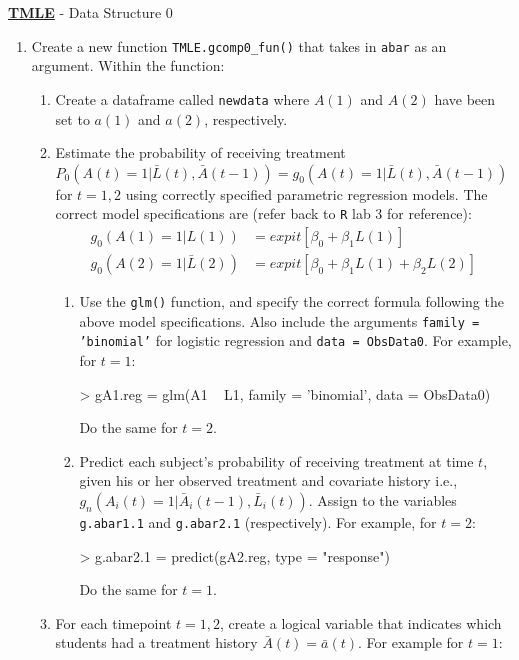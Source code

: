 \documentclass[answers]{exam}
\begin{document}
\noindent \textbf{\underline{TMLE}} - Data Structure 0
\begin{enumerate}
\item Create a new function \texttt{TMLE.gcomp0\_fun()} that takes in \texttt{abar} as an argument. Within the function:
\begin{enumerate}
\item Create a dataframe called \texttt{newdata} where $A(1)$ and $A(2)$ have been set to $a(1)$ and $a(2)$, respectively.
\item Estimate the probability of receiving treatment $P_0(A(t)=1|\bar{L}(t), \bar{A}(t-1)) = g_0(A(t)=1|\bar{L}(t), \bar{A}(t-1))$ for $t = 1,2$ using correctly specified parametric regression models. The correct model specifications are (refer back to \texttt{R} lab 3 for reference):
\begin{align*}
g_0(A(1)=1|L(1)) & = expit[\beta_0 + \beta_1L(1)] \\
g_0(A(2)=1|\bar{L}(2)) & = expit[\beta_0 + \beta_1L(1) + \beta_2L(2)]
\end{align*}
\begin{enumerate}
\item Use the \texttt{glm()} function, and specify the correct formula following the above model specifications. Also include the arguments \texttt{family = 'binomial'} for logistic regression and \texttt{data = ObsData0}. For example, for $t = 1$:
\begin{Schunk}
\begin{Sinput}
> gA1.reg = glm(A1 ~ L1, family = 'binomial', data = ObsData0)
\end{Sinput}
\end{Schunk}
Do the same for $t = 2$.
\item Predict each subject's probability of receiving treatment at time $t$, given his or her observed treatment and covariate history i.e., $g_n(A_i(t)=1|\bar{A}_i(t-1), \bar{L}_i(t))$. Assign to the variables \texttt{g.abar1.1} and \texttt{g.abar2.1} (respectively). For example, for $t = 2$:
\begin{Schunk}
\begin{Sinput}
> g.abar2.1 = predict(gA2.reg, type = "response")
\end{Sinput}
\end{Schunk}
Do the same for $t = 1$.
\end{enumerate}
\item For each timepoint $t = 1, 2$, create a logical variable that indicates which students had a treatment history $\bar{A}(t) = \bar{a}(t)$. For example for $t = 1$:

\end{enumerate}
\end{enumerate}
\end{document}
